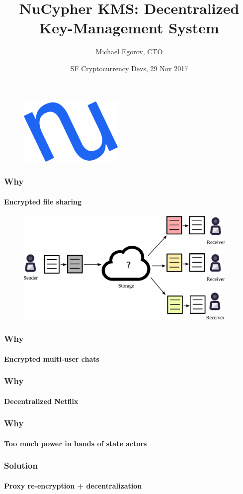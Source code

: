 \documentclass[xetex,mathsans,sans]{beamer}
\title[NuCypher KMS]{NuCypher KMS: Decentralized Key-Management System}
\author[Michael]{Michael Egorov, CTO}
\date[29 Nov 2017]{SF Cryptocurrency Devs, 29 Nov 2017}
\begin{document}
    \begin{frame}
        \titlepage
        \begin{figure}
            \centering
            \includegraphics[width=5cm]{pdf/nucypher_logo.pdf}
        \end{figure}
    \end{frame}

    \begin{frame}
        \frametitle{Why}
        \framesubtitle{Encrypted file sharing}
        \begin{figure}
            \centering
            \includegraphics[height=5.5cm]{pdf/file-sharing.pdf}
        \end{figure}
    \end{frame}

    \begin{frame}
        \frametitle{Why}
        \framesubtitle{Encrypted multi-user chats}
    \end{frame}

    \begin{frame}
        \frametitle{Why}
        \framesubtitle{Decentralized Netflix}
    \end{frame}

    \begin{frame}
        \frametitle{Why}
        \framesubtitle{Too much power in hands of state actors}
    \end{frame}

    \begin{frame}
        \frametitle{Solution}
        \framesubtitle{Proxy re-encryption + decentralization}
    \end{frame}
\end{document}
